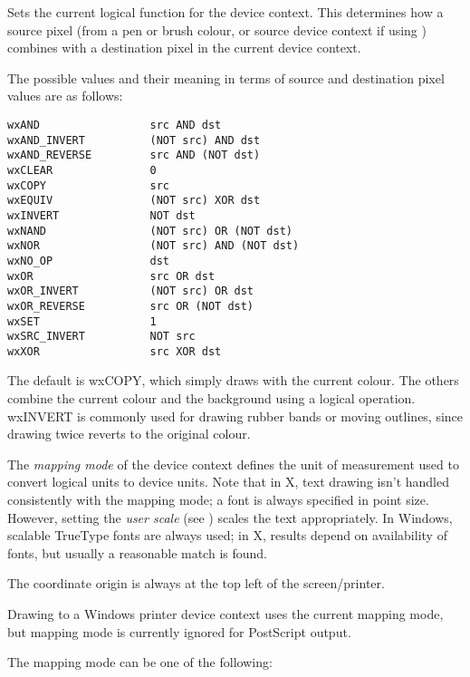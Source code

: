 Sets the current logical function for the device context.  This determines how
a source pixel (from a pen or brush colour, or source device context if
using ) combines with a destination pixel in the
current device context.

The possible values
and their meaning in terms of source and destination pixel values are
as follows:

\begin{verbatim}
wxAND                 src AND dst
wxAND_INVERT          (NOT src) AND dst
wxAND_REVERSE         src AND (NOT dst)
wxCLEAR               0
wxCOPY                src
wxEQUIV               (NOT src) XOR dst
wxINVERT              NOT dst
wxNAND                (NOT src) OR (NOT dst)
wxNOR                 (NOT src) AND (NOT dst)
wxNO_OP               dst
wxOR                  src OR dst
wxOR_INVERT           (NOT src) OR dst
wxOR_REVERSE          src OR (NOT dst)
wxSET                 1
wxSRC_INVERT          NOT src
wxXOR                 src XOR dst
\end{verbatim}

The default is wxCOPY, which simply draws with the current colour.
The others combine the current colour and the background using a
logical operation.  wxINVERT is commonly used for drawing rubber bands or
moving outlines, since drawing twice reverts to the original colour.


\label{wxdcsetmapmode}


The {\it mapping mode} of the device context defines the unit of
measurement used to convert logical units to device units. Note that
in X, text drawing isn't handled consistently with the mapping mode; a
font is always specified in point size. However, setting the {\it
user scale} (see ) scales the text appropriately. In
Windows, scalable TrueType fonts are always used; in X, results depend
on availability of fonts, but usually a reasonable match is found.

The coordinate origin is always at the top left of the screen/printer.

Drawing to a Windows printer device context uses the current mapping mode,
but mapping mode is currently ignored for PostScript output.

The mapping mode can be one of the following:

\begin{twocollist}\itemsep=0pt
\end{twocollist}


